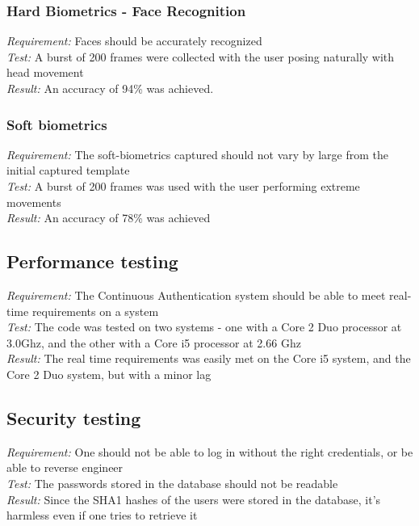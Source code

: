 \documentclass[12pt]{article}			%
\begin{document}
\subsubsection{ Hard Biometrics - Face Recognition }
\emph{ Requirement: } Faces should be accurately recognized\\
\emph{ Test: } A burst of 200 frames were collected with the user posing naturally with head movement\\
\emph{ Result: } An accuracy of 94\% was achieved.\\

\subsubsection{ Soft biometrics }
\emph{ Requirement: } The soft-biometrics captured should not vary by large from the initial captured template\\
\emph{ Test: } A burst of 200 frames was used with the user performing extreme movements\\
\emph{ Result: } An accuracy of 78\% was achieved\\

\subsection{ Performance testing } 
\emph{ Requirement: } The Continuous Authentication system should be able to meet real-time requirements on a system\\
\emph{ Test: } The code was tested on two systems - one with a Core 2 Duo processor at 3.0Ghz, and the other with a Core i5 processor at 2.66 Ghz\\
\emph{ Result: } The real time requirements was easily met on the Core i5 system, and the Core 2 Duo system, but with a minor lag\\

\subsection{ Security testing}
\emph{ Requirement: } One should not be able to log in without the right credentials, or be able to reverse engineer\\
\emph{ Test: } The passwords stored in the database should not be readable\\
\emph{ Result: } Since the SHA1 hashes of the users were stored in the database, it's harmless even if one tries to retrieve it\\
\end{document}
